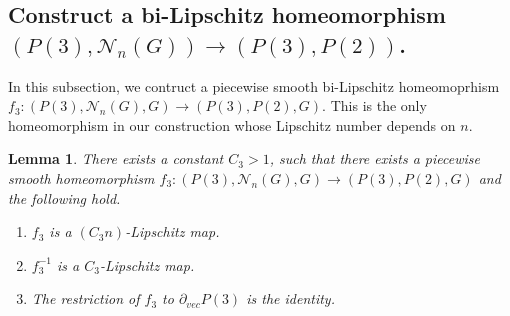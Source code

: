 \documentclass{amsart}
\newtheorem{lem}[thm]{Lemma}
\begin{document}
\subsection{Construct a bi-Lipschitz homeomorphism $(P(3),\mathcal{N}_n(G))\to (P(3),P(2))$.}

In this subsection, we contruct a piecewise smooth bi-Lipschitz homeomoprhism $f_3:(P(3),\mathcal{N}_n(G),G)\to (P(3),P(2),G)$. This is the only homeomorphism in our construction whose Lipschitz number depends on $n$.

\begin{lem}\label{dependonn}
There exists a constant $C_3>1$, such that there exists a piecewise smooth homeomorphism $f_3:(P(3),\mathcal{N}_n(G),G)\to (P(3),P(2),G)$ and the following hold.
\begin{enumerate}
\item $f_3$ is a $(C_3n)$-Lipschitz map.
\item $f_3^{-1}$ is a $C_3$-Lipschitz map. 
\item The restriction of $f_3$ to $\partial_{vec}P(3)$ is the identity.
 \end{enumerate}
\end{lem}
\end{document}
